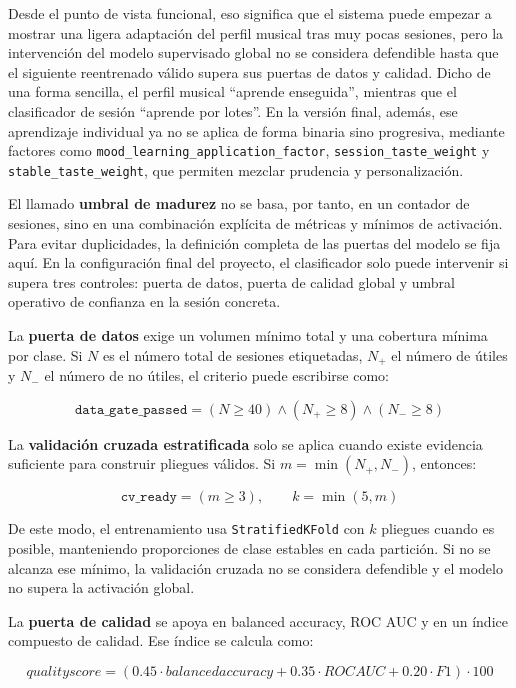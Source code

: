 Desde el punto de vista funcional, eso significa que el sistema puede empezar a
mostrar una ligera adaptación del perfil musical tras muy pocas sesiones, pero
la intervención del modelo supervisado global no se considera defendible hasta
que el siguiente reentrenado válido supera sus puertas de datos y calidad.
Dicho de una forma sencilla, el perfil musical ``aprende enseguida'',
mientras que el clasificador de sesión ``aprende por lotes''. En la versión
final, además, ese aprendizaje individual ya no se aplica de forma binaria
sino progresiva, mediante factores como
\texttt{mood\_learning\_application\_factor},
\texttt{session\_taste\_weight} y \texttt{stable\_taste\_weight}, que permiten
mezclar prudencia y personalización.

El llamado \textbf{umbral de madurez} no se basa, por tanto, en un contador de
sesiones, sino en una combinación explícita de métricas y mínimos de activación.
Para evitar duplicidades, la definición completa de las puertas del modelo se
fija aquí. En la configuración final del proyecto, el clasificador solo puede
intervenir si supera tres controles: puerta de datos, puerta de calidad global
y umbral operativo de confianza en la sesión concreta.

La \textbf{puerta de datos} exige un volumen mínimo total y una cobertura mínima
por clase. Si \(N\) es el número total de sesiones etiquetadas, \(N_{+}\) el
número de útiles y \(N_{-}\) el número de no útiles, el criterio puede
escribirse como:

\[
\texttt{data\_gate\_passed} =
(N \geq 40) \land (N_{+} \geq 8) \land (N_{-} \geq 8)
\]

La \textbf{validación cruzada estratificada} solo se aplica cuando existe
evidencia suficiente para construir pliegues válidos. Si
\(m = \min(N_{+}, N_{-})\), entonces:

\[
\texttt{cv\_ready} = (m \geq 3), \qquad k = \min(5, m)
\]

De este modo, el entrenamiento usa \texttt{StratifiedKFold} con \(k\) pliegues
cuando es posible, manteniendo proporciones de clase estables en cada
partición. Si no se alcanza ese mínimo, la validación cruzada no se considera
defendible y el modelo no supera la activación global.

La \textbf{puerta de calidad} se apoya en balanced accuracy, ROC AUC y en un
índice compuesto de calidad. Ese índice se calcula como:

\[
quality score =
(0.45 \cdot balanced accuracy
+ 0.35 \cdot ROC AUC
+ 0.20 \cdot F1) \cdot 100
\]

